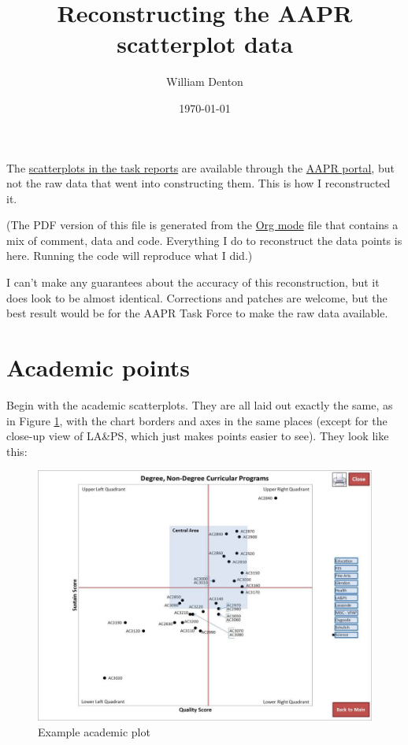 \documentclass[article,10pt,microtype]{article}
\author{William Denton}
\date{\today}
\title{Reconstructing the AAPR scatterplot data}
\begin{document}
\maketitle
The \href{https://yulink.yorku.ca/group/aap/scatterplots/pifs}{scatterplots in the task reports} are available through the \href{https://yulink.yorku.ca/group/aap}{AAPR portal}, but not the raw data that went into constructing them.  This is how I reconstructed it.

(The PDF version of this file is generated from the \href{http://orgmode.org/}{Org mode} file that contains a mix of comment, data and code.  Everything I do to reconstruct the data points is here. Running the code will reproduce what I did.)

I can't make any guarantees about the accuracy of this reconstruction, but it does look to be almost identical.  Corrections and patches are welcome, but the best result would be for the AAPR Task Force to make the raw data available.

\section*{Academic points}
\label{sec-1}

Begin with the academic scatterplots.  They are all laid out exactly the same, as in Figure \ref{fig:academic}, with the chart borders and axes in the same places (except for the close-up view of LA\&PS, which just makes points easier to see).  They look like this:

\begin{figure}[htb]
\centering
\includegraphics[width=.9\linewidth]{FspAcademicScience.JPG}
\caption{\label{fig:academic}Example academic plot}
\end{figure}
\end{document}
